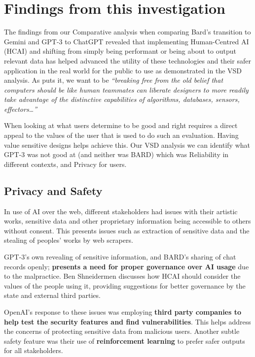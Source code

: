 \newpage
\section{Findings from this investigation}

The findings from our Comparative analysis when comparing Bard’s transition to Gemini and GPT-3 to ChatGPT revealed that implementing Human-Centred AI (HCAI) and shifting from simply being performant or being about to output relevant data has helped advanced the utility of these technologies and their safer application in the real world for the public to use as demonstrated in the VSD analysis. As \cite{Shneiderman2020} puts it, we want to be \textit{``breaking free from the old belief that computers should be like human teammates can liberate designers to more readily take advantage of the distinctive capabilities of algorithms, databases, sensors, effectors…''} 

When looking at what users determine to be good and right requires a direct appeal to the values of the user that is used to do such an evaluation. Having value sensitive designs helps achieve this. Our VSD analysis we can identify what GPT-3 was not good at (and neither was BARD) which was Reliability in different contexts, and Privacy for users.

\subsection{Privacy and Safety}

In use of AI over the web, different stakeholders had issues with their artistic works, sensitive data and other proprietary information being accessible to others without consent. This presents issues such as extraction of sensitive data and the stealing of peoples' works by web scrapers.

GPT-3’s own revealing of sensitive information, and BARD’s sharing of chat records openly; \textbf{presents a need for proper governance over AI usage} due to the malpractice. Ben Shneidermen discusses how HCAI should consider the values of the people using it, providing suggestions for better governance by the state and external third parties.

OpenAI’s response to these issues was employing \textbf{third party companies to help test the security features and find vulnerabilities}. This helps address the concerns of protecting sensitive data from malicious users. Another subtle safety feature was their use of \textbf{reinforcement learning} to prefer safer outputs for all stakeholders.

